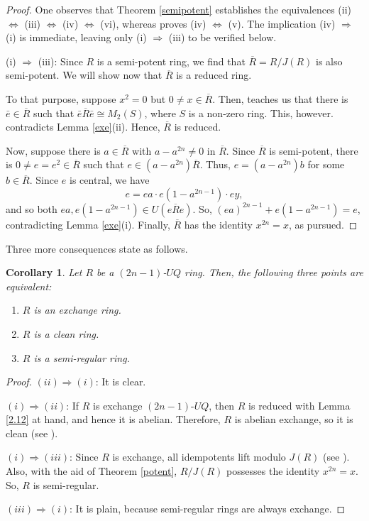 \documentclass[12pt]{amsart}
\newtheorem{corollary}[theorem]{Corollary}
\theoremstyle{definition}
\begin{document}
\begin{proof}
One observes that Theorem \ref{semipotent} establishes the equivalences (ii) $\Leftrightarrow$ (iii) $\Leftrightarrow$ (iv) $\Leftrightarrow$ (vi), whereas \cite[Proposition 2.9]{3} proves (iv) $\Leftrightarrow$ (v). The implication (iv) $\Rightarrow$ (i) is immediate, leaving only (i) $\Rightarrow$ (iii) to be verified below.

(i) $\Rightarrow$ (iii): Since $R$ is a semi-potent ring, we find that $\overline{R} = R/J(R)$ is also semi-potent. We will show now that $\overline{R}$ is a reduced ring.

To that purpose, suppose $x^2 = 0$ but $0 \neq x \in \overline{R}$. Then, \cite[Theorem 2.1]{9} teaches us that there is $\bar{e} \in \overline{R}$ such that $\bar{e}\overline{R}\bar{e} \cong M_2(S)$, where $S$ is a non-zero ring. This, however. contradicts Lemma \ref{exe}(ii). Hence, $\overline{R}$ is reduced.

Now, suppose there is $a \in \overline{R}$ with $a - a^{2n} \neq 0$ in $\overline{R}$. Since $\overline{R}$ is semi-potent, there is $0\neq e = e^2 \in \overline{R}$ such that $e \in (a - a^{2n})\overline{R}$. Thus, $e = (a - a^{2n})b$ for some $b \in \overline{R}$. Since $e$ is central, we have $$e = ea \cdot e(1-a^{2n-1}) \cdot ey,$$ and so both $ea, e(1-a^{2n-1}) \in U(e\overline{R}e)$. So, $(ea)^{2n-1} + e(1-a^{2n-1}) = e$, contradicting Lemma \ref{exe}(i). Finally, $\overline{R}$ has the identity $x^{2n}=x$, as pursued.
\end{proof}

Three more consequences state as follows.

\begin{corollary}\label{2.16}
Let \( R \) be a $(2n-1)$-$UQ$ ring. Then, the following three points are equivalent:
\begin{enumerate}
\item
\( R \) is an exchange ring.
\item
\( R \) is a clean ring.
\item
\( R \) is a semi-regular ring.
\end{enumerate}
\end{corollary}

\begin{proof}
\((ii) \Rightarrow (i)\): It is clear.

\((i) \Rightarrow (ii)\): If \( R \) is exchange $(2n-1)$-$UQ$, then \( R \) is reduced with Lemma \ref{2.12} at hand, and hence it is abelian. Therefore, \( R \) is abelian exchange, so it is clean (see \cite{5}).

\((i) \Rightarrow (iii)\): Since $R$ is exchange, all idempotents lift modulo \(J(R)\) (see \cite{5}). Also, with the aid of Theorem \ref{potent}, \(R/J(R)\) possesses the identity $x^{2n}=x$. So, $R$ is semi-regular.

\((iii) \Rightarrow (i)\): It is plain, because semi-regular rings are always exchange.
\end{proof}
\end{document}
